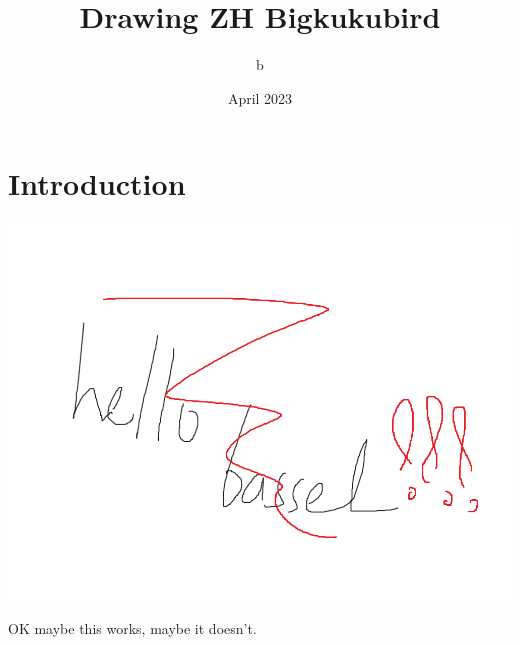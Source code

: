 \documentclass{article}
\title{Drawing ZH Bigkukubird}
\author{b}
\date{April 2023}
\begin{document}
\maketitle

\section{Introduction}

\includegraphics[]{image0.png}

OK maybe this works, maybe it doesn't.
\end{document}
